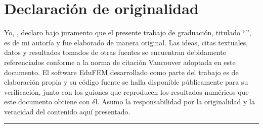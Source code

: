 
\chapter*{Declaración de originalidad}

\noindent Yo, \autorTesis, declaro bajo juramento que el presente trabajo de graduación, titulado \enquote{\tituloTesis}, es de mi autoría y fue elaborado de manera original. Las ideas, citas textuales, datos y resultados tomados de otras fuentes se encuentran debidamente referenciados conforme a la norma de citación Vancouver adoptada en este documento. El software EduFEM desarrollado como parte del trabajo es de elaboración propia y su código fuente se halla disponible públicamente para su verificación, junto con los guiones que reproducen los resultados numéricos que este documento obtiene con él. Asumo la responsabilidad por la originalidad y la veracidad del contenido aquí presentado.

%

\vspace{2.5cm}
\begin{center}
\rule{7cm}{0.4pt}\\[2pt]
\autorTesis\\
\carrera\\
\ciudadTesis
\end{center}

